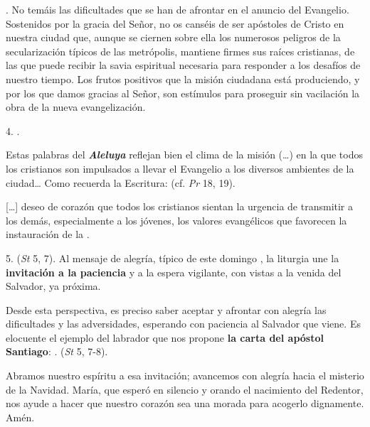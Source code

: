 \begin{body}
					. No temáis las dificultades que se han de afrontar en el anuncio del Evangelio. Sostenidos por la gracia del Señor, no os canséis de ser apóstoles de Cristo en nuestra ciudad que, aunque se ciernen sobre ella los numerosos peligros de la secularización típicos de las metrópolis, mantiene firmes sus raíces cristianas, de las que puede recibir la savia espiritual necesaria para responder a los desafíos de nuestro tiempo. Los frutos positivos que la misión ciudadana está produciendo, y por los que damos gracias al Señor, son estímulos para proseguir sin vacilación la obra de la nueva evangelización.
					
					4. .
					
					Estas palabras del \emph{\textbf{Aleluya}} reflejan bien el clima de la misión (\ldots{}) en la que todos los cristianos son impulsados a llevar el Evangelio a los diversos ambientes de la ciudad\ldots{} Como recuerda la Escritura:  (cf. \emph{Pr} 18, 19).
					
					[\ldots{}] deseo de corazón que todos los cristianos sientan la urgencia de transmitir a los demás, especialmente a los jóvenes, los valores evangélicos que favorecen la instauración de la .
					
					5.  (\emph{St} 5, 7). Al mensaje de alegría, típico de este domingo , la liturgia une la \textbf{invitación a la paciencia} y a la espera vigilante, con vistas a la venida del Salvador, ya próxima.
					
					Desde esta perspectiva, es preciso saber aceptar y afrontar con alegría las dificultades y las adversidades, esperando con paciencia al Salvador que viene. Es elocuente el ejemplo del labrador que nos propone \textbf{la carta del apóstol Santiago}: .  (\emph{St} 5, 7-8).
					
					Abramos nuestro espíritu a esa invitación; avancemos con alegría hacia el misterio de la Navidad. María, que esperó en silencio y orando el nacimiento del Redentor, nos ayude a hacer que nuestro corazón sea una morada para acogerlo dignamente. Amén.
				\end{body}
			
